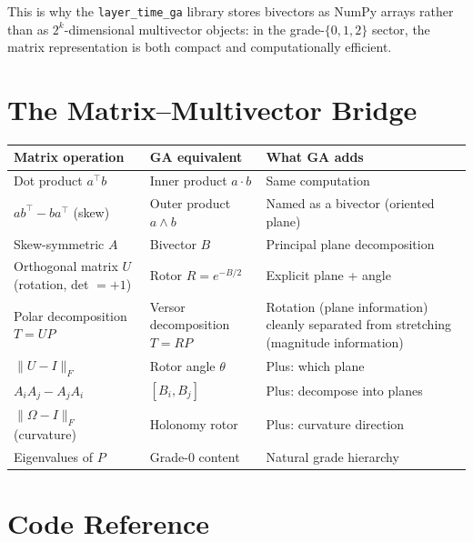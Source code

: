 \documentclass[11pt, twoside, openright]{memoir}
\newcommand{\ip}{\cdot}           %
\newcommand{\op}{\wedge}          %
\begin{document}
This is why the \texttt{layer\_time\_ga} library stores bivectors as
NumPy arrays rather than as $2^k$-dimensional multivector objects:
in the grade-$\{0, 1, 2\}$ sector, the matrix representation is both
compact and computationally efficient.


\chapter{The Matrix--Multivector Bridge}
\label{app:bridge}

\begin{center}
\renewcommand{\arraystretch}{1.5}\small
\begin{tabularx}{\textwidth}{@{}l l X@{}}
\toprule
\textbf{Matrix operation} & \textbf{GA equivalent} & \textbf{What GA adds} \\
\midrule
Dot product $a^\top b$ & Inner product $a \ip b$ &
  Same computation \\
$ab^\top - ba^\top$ (skew) & Outer product $a \op b$ &
  Named as a bivector (oriented plane) \\
Skew-symmetric $A$ & Bivector $B$ &
  Principal plane decomposition \\
Orthogonal matrix $U$ (rotation, det $= +1$) & Rotor $R = e^{-B/2}$ &
  Explicit plane + angle \\
Polar decomposition $T = UP$ & Versor decomposition $T = RP$ &
  Rotation (plane information) cleanly separated from stretching (magnitude information) \\
$\|U - I\|_F$ & Rotor angle $\theta$ &
  Plus: which plane \\
$A_i A_j - A_j A_i$ & $[B_i, B_j]$ &
  Plus: decompose into planes \\
$\|\Omega - I\|_F$ (curvature) & Holonomy rotor &
  Plus: curvature direction \\
Eigenvalues of $P$ & Grade-0 content &
  Natural grade hierarchy \\
\bottomrule
\end{tabularx}
\end{center}


\chapter{Code Reference}
\label{app:code}
\end{document}
